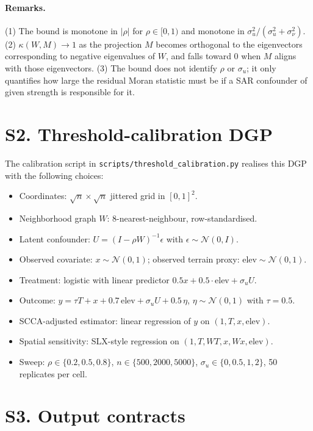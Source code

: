 \documentclass{article}
\begin{document}
\paragraph{Remarks.}
(1) The bound is monotone in $|\rho|$ for $\rho \in [0, 1)$ and
    monotone in $\sigma_u^2 / (\sigma_u^2 + \sigma_\nu^2)$.
(2) $\kappa(W, M) \to 1$ as the projection $M$ becomes orthogonal to
    the eigenvectors corresponding to negative eigenvalues of $W$,
    and falls toward 0 when $M$ aligns with those eigenvectors.
(3) The bound does not identify $\rho$ or $\sigma_u$; it only
    quantifies how large the residual Moran statistic must be if a
    SAR confounder of given strength is responsible for it.

\section{S2. Threshold-calibration DGP}

The calibration script in \texttt{scripts/threshold\_calibration.py}
realises this DGP with the following choices:
\begin{itemize}
\item Coordinates: $\sqrt{n} \times \sqrt{n}$ jittered grid in $[0,1]^2$.
\item Neighborhood graph $W$: 8-nearest-neighbour, row-standardised.
\item Latent confounder: $U = (I - \rho W)^{-1}\epsilon$ with
      $\epsilon \sim \mathcal{N}(0, I)$.
\item Observed covariate: $x \sim \mathcal{N}(0, 1)$; observed
      terrain proxy: $\mathrm{elev} \sim \mathcal{N}(0, 1)$.
\item Treatment: logistic with linear predictor
      $0.5 x + 0.5 \cdot \mathrm{elev} + \sigma_u U$.
\item Outcome: $y = \tau T + x + 0.7\,\mathrm{elev} + \sigma_u U + 0.5\,\eta$,
      $\eta \sim \mathcal{N}(0,1)$ with $\tau = 0.5$.
\item SCCA-adjusted estimator: linear regression of $y$ on
      $(1, T, x, \mathrm{elev})$.
\item Spatial sensitivity: SLX-style regression on
      $(1, T, WT, x, Wx, \mathrm{elev})$.
\item Sweep: $\rho \in \{0.2, 0.5, 0.8\}$,
      $n \in \{500, 2000, 5000\}$,
      $\sigma_u \in \{0, 0.5, 1, 2\}$, 50 replicates per cell.
\end{itemize}

\section{S3. Output contracts}
\end{document}
